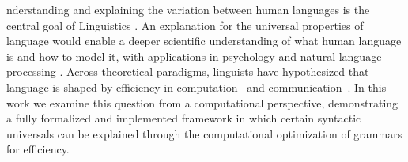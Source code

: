 \documentclass[9pt,twocolumn,twoside,lineno]{pnas-new}
\begin{document}


nderstanding and explaining the variation between human languages is the central  goal of Linguistics \cite{zipf1949human,greenberg1963universals,chomsky1993lectures,...}.
An explanation for the universal properties of language would enable a deeper scientific understanding of what human language is and how to model it, with applications in psychology and natural language processing \cite{hawkins2007processing,bender2009linguistically,bender2013linguistic}.
Across theoretical paradigms, linguists have hypothesized that language is shaped by efficiency in computation~\cite{berwick1984grammatical,chomsky2005three, hawkins2007processing} and communication~\cite{zipf1949human, Croft:Cruse:2004, Goldberg:2005}.
In this work we examine this question from a computational perspective, demonstrating a fully formalized and implemented framework in which certain syntactic universals can be explained through the computational optimization of grammars for efficiency. %








\end{document}
